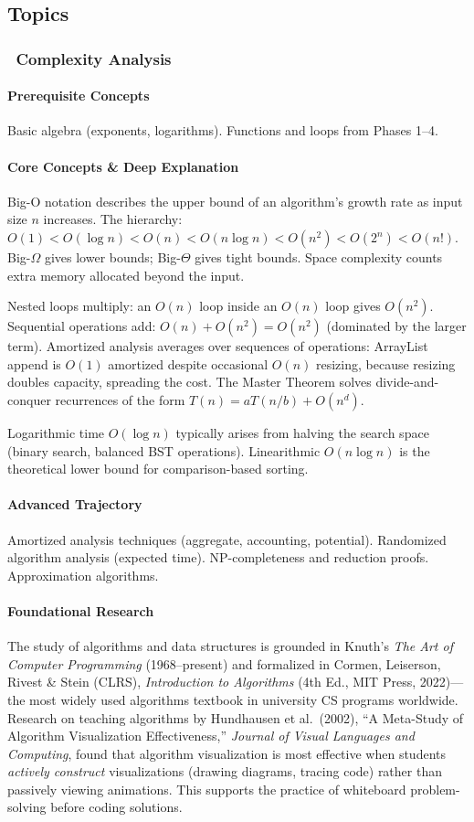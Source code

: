 \documentclass[11pt, a4paper, oneside]{report}
\newcommand{\mustmaster}[1]{\subsubsection{\texorpdfstring{\fcolorbox{blue!40!black}{blue!8}{\footnotesize\bfseries\color{blue!40!black} MUST MASTER}~#1}{#1}}}
\begin{document}
\subsection*{Topics}

\mustmaster{Complexity Analysis}

\paragraph{Prerequisite Concepts} Basic algebra (exponents, logarithms). Functions and loops from Phases 1--4.

\paragraph{Core Concepts \& Deep Explanation} Big-O notation describes the upper bound of an algorithm's growth rate as input size $n$ increases. The hierarchy: $O(1) < O(\log n) < O(n) < O(n \log n) < O(n^2) < O(2^n) < O(n!)$. Big-$\Omega$ gives lower bounds; Big-$\Theta$ gives tight bounds. Space complexity counts extra memory allocated beyond the input.

Nested loops multiply: an $O(n)$ loop inside an $O(n)$ loop gives $O(n^2)$. Sequential operations add: $O(n) + O(n^2) = O(n^2)$ (dominated by the larger term). Amortized analysis averages over sequences of operations: ArrayList append is $O(1)$ amortized despite occasional $O(n)$ resizing, because resizing doubles capacity, spreading the cost. The Master Theorem solves divide-and-conquer recurrences of the form $T(n) = aT(n/b) + O(n^d)$.

Logarithmic time $O(\log n)$ typically arises from halving the search space (binary search, balanced BST operations). Linearithmic $O(n \log n)$ is the theoretical lower bound for comparison-based sorting.

\paragraph{Advanced Trajectory} Amortized analysis techniques (aggregate, accounting, potential). Randomized algorithm analysis (expected time). NP-completeness and reduction proofs. Approximation algorithms.


\paragraph{Foundational Research} The study of algorithms and data structures is grounded in Knuth's \emph{The Art of Computer Programming} (1968--present) and formalized in Cormen, Leiserson, Rivest \& Stein (CLRS), \emph{Introduction to Algorithms} (4th Ed., MIT Press, 2022)---the most widely used algorithms textbook in university CS programs worldwide. Research on teaching algorithms by Hundhausen et al.\ (2002), ``A Meta-Study of Algorithm Visualization Effectiveness,'' \emph{Journal of Visual Languages and Computing}, found that algorithm visualization is most effective when students \emph{actively construct} visualizations (drawing diagrams, tracing code) rather than passively viewing animations. This supports the practice of whiteboard problem-solving before coding solutions.
\end{document}
